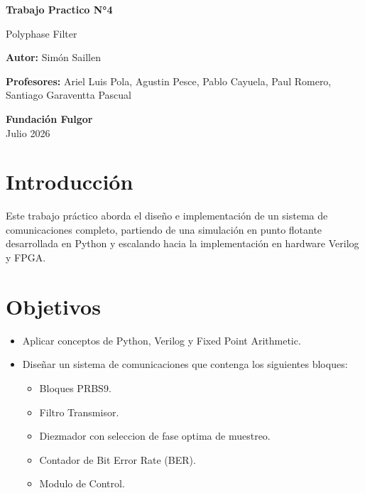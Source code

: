 \documentclass[11pt,a4paper]{article}
\begin{document}
\begin{titlepage}
    \begin{center}
        \vspace*{1cm}

        \Huge
        \textbf{Trabajo Practico N°4}

        \vspace{0.5cm}
        \LARGE
        Polyphase Filter

        \vspace{1.5cm}

        \vfill

        \Large
        \textbf{Autor:} Simón Saillen

        \Large
        \textbf{Profesores:} Ariel Luis Pola, Agustin Pesce, Pablo Cayuela, Paul Romero, Santiago Garaventta Pascual

        \vspace{0.5cm}

        \Large
        \textbf{Fundación Fulgor}\\
        Julio 2026

    \end{center}
\end{titlepage}
\newpage

\section{Introducción}

Este trabajo práctico aborda el diseño e implementación de un sistema de
comunicaciones completo, partiendo de una simulación en punto flotante
desarrollada en Python y escalando hacia la implementación en hardware Verilog
y FPGA.\@

\section{Objetivos}

\begin{itemize}
    \item Aplicar conceptos de Python, Verilog y Fixed Point Arithmetic.
    \item Diseñar un sistema de comunicaciones que contenga los siguientes bloques:
          \begin{itemize}
              \item Bloques PRBS9.
              \item Filtro Transmisor.
              \item Diezmador con seleccion de fase optima de muestreo.
              \item Contador de Bit Error Rate (BER).
              \item Modulo de Control.
          \end{itemize}
\end{itemize}
\end{document}
